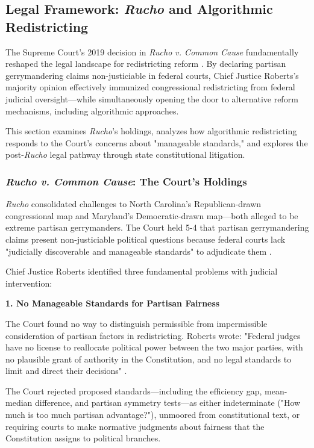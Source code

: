 \subsection{Legal Framework: \textit{Rucho} and Algorithmic Redistricting}
\label{sec:rucho-framework}

The Supreme Court's 2019 decision in \textit{Rucho v. Common Cause} fundamentally reshaped the legal landscape for redistricting reform \citep{rucho2019}. By declaring partisan gerrymandering claims non-justiciable in federal courts, Chief Justice Roberts's majority opinion effectively immunized congressional redistricting from federal judicial oversight—while simultaneously opening the door to alternative reform mechanisms, including algorithmic approaches.

This section examines \textit{Rucho}'s holdings, analyzes how algorithmic redistricting responds to the Court's concerns about "manageable standards," and explores the post-\textit{Rucho} legal pathway through state constitutional litigation.

\subsubsection{\textit{Rucho v. Common Cause}: The Court's Holdings}

\textit{Rucho} consolidated challenges to North Carolina's Republican-drawn congressional map and Maryland's Democratic-drawn map—both alleged to be extreme partisan gerrymanders. The Court held 5-4 that partisan gerrymandering claims present non-justiciable political questions because federal courts lack "judicially discoverable and manageable standards" to adjudicate them \citep{rucho2019}.

Chief Justice Roberts identified three fundamental problems with judicial intervention:

\textbf{1. No Manageable Standards for Partisan Fairness}

The Court found no way to distinguish permissible from impermissible consideration of partisan factors in redistricting. Roberts wrote: "Federal judges have no license to reallocate political power between the two major parties, with no plausible grant of authority in the Constitution, and no legal standards to limit and direct their decisions" \citep{rucho2019}.

The Court rejected proposed standards—including the efficiency gap, mean-median difference, and partisan symmetry tests—as either indeterminate ("How much is too much partisan advantage?"), unmoored from constitutional text, or requiring courts to make normative judgments about fairness that the Constitution assigns to political branches.

